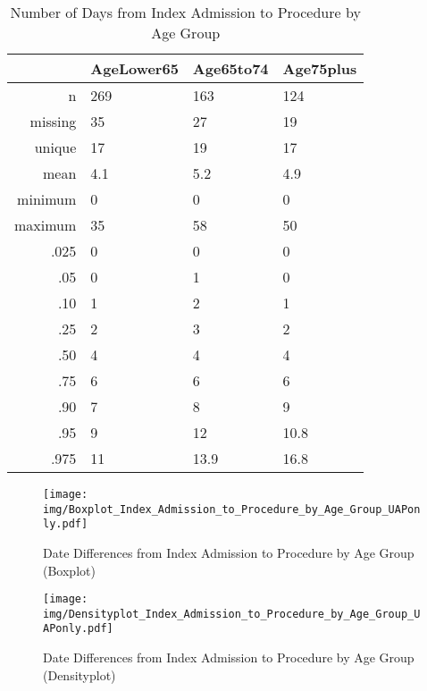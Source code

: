 \documentclass[a4paper]{report}
\begin{document}
\begin{itemize}
{%
\begin{table}[ht]
\centering
\begin{tabular}{rlll}
  \toprule
 & AgeLower65 & Age65to74 & Age75plus \\ 
  \midrule
n & 269 & 163 & 124 \\ 
  missing & 35 & 27 & 19 \\ 
  unique & 17 & 19 & 17 \\ 
  mean & 4.1 & 5.2 & 4.9 \\ 
  minimum & 0 & 0 & 0 \\ 
  maximum & 35 & 58 & 50 \\ 
  .025 & 0 & 0 & 0 \\ 
  .05 & 0 & 1 & 0 \\ 
  .10 & 1 & 2 & 1 \\ 
  .25 & 2 & 3 & 2 \\ 
  .50 & 4 & 4 & 4 \\ 
  .75 & 6 & 6 & 6 \\ 
  .90 & 7 & 8 & 9 \\ 
  .95 & 9 & 12 & 10.8 \\ 
  .975 & 11 & 13.9 & 16.8 \\ 
   \bottomrule
\end{tabular}
\caption{Number of Days from Index Admission to Procedure by Age Group} 
\end{table}
\begin{figure}
  \centering
  \caption{Date Differences from Index Admission to Procedure by Age Group (Boxplot)}
  \label{Boxplot: Date Differences from Index Admission to Procedure by Age Group}
\texttt{[image: img/Boxplot\_Index\_Admission\_to\_Procedure\_by\_Age\_Group\_UAPonly.pdf]}\end{figure}


\begin{figure}
  \centering
  \caption{Date Differences from Index Admission to Procedure by Age Group (Densityplot)}
  \label{Density: Date Differences from Index Admission to Procedure by Age Group}
\texttt{[image: img/Densityplot\_Index\_Admission\_to\_Procedure\_by\_Age\_Group\_UAPonly.pdf]}\end{figure}



\clearpage

}
\end{itemize}
\end{document}
